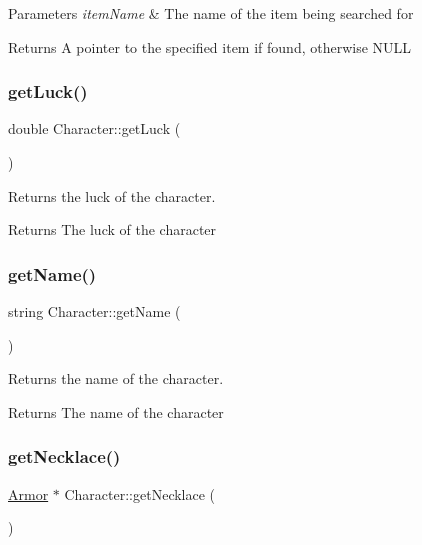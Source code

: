 \begin{DoxyParams}{Parameters}
{\em item\+Name} & The name of the item being searched for \\
\hline
\end{DoxyParams}
\begin{DoxyReturn}{Returns}
A pointer to the specified item if found, otherwise N\+U\+LL 
\end{DoxyReturn}
\mbox{\label{class_character_afe5886a4e21bf06cc44eef1f18e85ad6}} 
\subsubsection{\texorpdfstring{getLuck()}{getLuck()}}
{\footnotesize\ttfamily double Character\+::get\+Luck (\begin{DoxyParamCaption}{ }\end{DoxyParamCaption})}



Returns the luck of the character. 

\begin{DoxyReturn}{Returns}
The luck of the character 
\end{DoxyReturn}
\mbox{\label{class_character_ac2277578bac771149e518e3d5652807c}} 
\subsubsection{\texorpdfstring{getName()}{getName()}}
{\footnotesize\ttfamily string Character\+::get\+Name (\begin{DoxyParamCaption}{ }\end{DoxyParamCaption})}



Returns the name of the character. 

\begin{DoxyReturn}{Returns}
The name of the character 
\end{DoxyReturn}
\mbox{\label{class_character_a8e5929a6b0405a011b2055a25e7ef41f}} 
\subsubsection{\texorpdfstring{getNecklace()}{getNecklace()}}
{\footnotesize\ttfamily \mbox{\hyperlink{class_armor}{Armor}} $\ast$ Character\+::get\+Necklace (\begin{DoxyParamCaption}{ }\end{DoxyParamCaption})}



